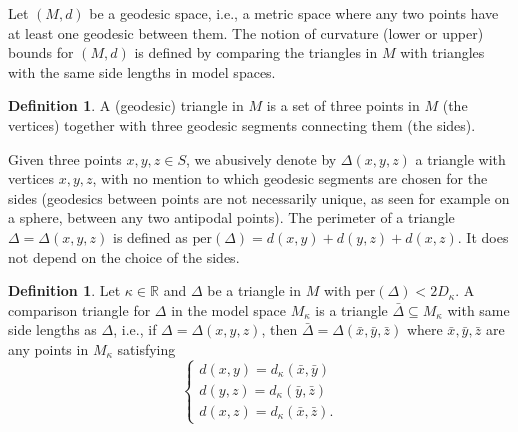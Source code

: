 \documentclass[10pt,a4paper]{article}
\theoremstyle{plain}
\theoremstyle{definition}
\newtheorem{definition}[theorem]{Definition}
\theoremstyle{remark}
\newcommand{\R}{\mathbb{R}}
\newcommand{\per}{\mathrm{per}}
\begin{document}



Let $(M,d)$ be a geodesic space, i.e., a metric space where any two points have at least one geodesic between them. The notion of curvature (lower or upper) bounds for $(M,d)$ is defined by comparing the triangles in $M$ with triangles with the same side lengths in model spaces. 

\begin{definition}
	A (geodesic) triangle in $M$ is a set of three points in $M$ (the vertices) together with three geodesic segments connecting them (the sides). 
\end{definition}

Given three points $x,y,z\in S$, we abusively denote by $\Delta(x,y,z)$ a triangle with vertices $x,y,z$, with no mention to which geodesic segments are chosen for the sides (geodesics between points are not necessarily unique, as seen for example on a sphere, between any two antipodal points). The perimeter of a triangle $\Delta=\Delta(x,y,z)$ is defined as $\per(\Delta)=d(x,y)+d(y,z)+d(x,z)$. It does not depend on the choice of the sides. 

\begin{definition}
	Let $\kappa\in\R$ and $\Delta$ be a triangle in $M$ with $\per(\Delta)<2D_\kappa$. A comparison triangle for $\Delta$ in the model space $M_\kappa$ is a triangle $\bar\Delta\subseteq M_\kappa$ with same side lengths as $\Delta$, i.e., if $\Delta=\Delta(x,y,z)$, then $\bar\Delta=\Delta(\bar x,\bar y,\bar z)$ where $\bar x,\bar y,\bar z$ are any points in $M_\kappa$ satisfying 
	$$\begin{cases} d(x,y)=d_\kappa(\bar x,\bar y) \\ d(y,z)=d_\kappa(\bar y,\bar z) \\ d(x,z)=d_\kappa(\bar x,\bar z). \end{cases}$$
\end{definition}
\end{document}
